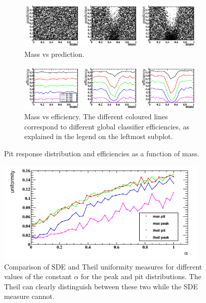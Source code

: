 \begin{figure}[h]
\centering
		\begin{subfigure}[b]{0.95\textwidth}
			\includegraphics[width=\textwidth]{graphs/PitDistributions.png}
			\caption{Mass vs prediction.}
		\end{subfigure}
		\begin{subfigure}[b]{0.95\textwidth}
			\includegraphics[width=\textwidth]{graphs/PitEffs.png}
			\caption{Mass vs efficiency. The different coloured lines correspond to
				different global classifier efficiencies, as explained in the legend on the leftmost subplot.}
		\end{subfigure}
		\caption{Pit response distribution and efficiencies as a function of mass. \label{fig:pitdists}}
\end{figure}

\begin{figure}[h]
\centering
	\includegraphics[width=0.9\textwidth]{graphs/TheilVsMSE.png}
	\caption{Comparison of SDE and Theil uniformity measures for different values of the constant $\alpha$ for the peak and pit distributions.
The Theil can clearly distinguish between these two while the SDE measure cannot.}
\end{figure}

